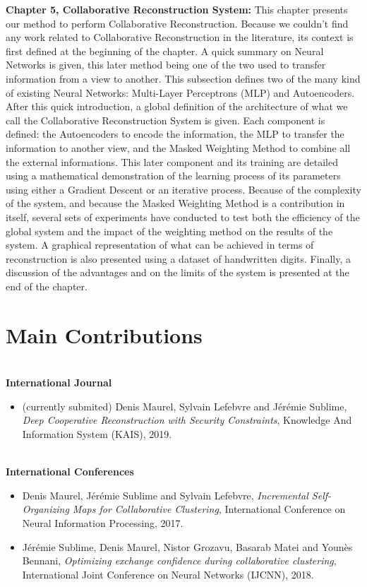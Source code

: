 \textbf{Chapter 5, Collaborative Reconstruction System:} This chapter presents our method to perform Collaborative Reconstruction. Because we couldn't find any work related to Collaborative Reconstruction in the literature, its context is first defined at the beginning of the chapter. A quick summary on Neural Networks is given, this later method being one of the two used to transfer information from a view to another. This subsection defines two of the many kind of existing Neural Networks: Multi-Layer Perceptrons (MLP) and Autoencoders. After this quick introduction, a global definition of the architecture of what we call the Collaborative Reconstruction System is given. Each component is defined: the Autoencoders to encode the information, the MLP to transfer the information to another view, and the Masked Weighting Method to combine all the external informations. This later component and its training are detailed using a mathematical demonstration of the learning process of its parameters using either a Gradient Descent or an iterative process. Because of the complexity of the system, and because the Masked Weighting Method is a contribution in itself, several sets of experiments have conducted to test both the efficiency of the global system and the impact of the weighting method on the results of the system. A graphical representation of what can be achieved in terms of reconstruction is also presented using a dataset of handwritten digits. Finally, a discussion of the advantages and on the limits of the system is presented at the end of the chapter.\\


\section{Main Contributions}

\textbf{\\International Journal}

\begin{itemize}
    \item (currently submited) Denis Maurel, Sylvain Lefebvre and J{\'{e}}r{\'{e}}mie Sublime,
        \textit{Deep Cooperative Reconstruction with Security Constraints},
        Knowledge And Information System (KAIS),
        2019.
\end{itemize}

\textbf{\\International Conferences}

\begin{itemize}
    \item Denis Maurel, J{\'e}r{\'e}mie Sublime and Sylvain Lefebvre,
        \textit{Incremental Self-Organizing Maps for Collaborative Clustering},
        International Conference on Neural Information Processing,
        2017.

    \item J{\'e}r{\'e}mie Sublime, Denis Maurel, Nistor Grozavu, Basarab Matei and Younès Bennani,
        \textit{Optimizing exchange confidence during collaborative clustering},
        International Joint Conference on Neural Networks (IJCNN),
        2018.
\end{itemize}

